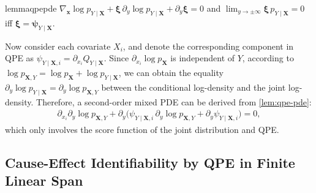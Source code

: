 \documentclass{article}
\theoremstyle{plain}
\theoremstyle{definition}
\theoremstyle{remark}
\begin{document}
\begin{restatable}{lemma}{qpepde}
\label{lem:qpe-pde}
$\nabla_{\bm{x}}\log p_{Y\mid\bm{X}}+\bm{\xi}\,\partial_y\log p_{Y\mid\bm{X}}+\partial_y\bm{\xi}=0$ and $\lim_{y\to\pm\infty}\bm{\xi}\,p_{Y\mid\bm{X}}=0$ iff $\bm{\xi}=\bm{\psi}_{Y\mid\bm{X}}$.
\end{restatable}

Now consider each covariate $X_i$, and denote the corresponding component in QPE as $\psi_{Y\mid\bm{X},i}=\partial_{x_i}Q_{Y\mid\bm{X}}$. Since $\partial_{x_i}\log p_{\bm{X}}$ is independent of $Y$, according to $\log p_{\bm{X},Y}=\log p_{\bm{X}}+\log p_{Y\mid\bm{X}}$, we can obtain the equality $\partial_y\log p_{Y\mid\bm{X}}=\partial_y\log p_{\bm{X},Y}$ between the conditional log-density and the joint log-density. Therefore, a second-order mixed PDE can be derived from \cref{lem:qpe-pde}:
\begin{align}
\label{eq:mixed-pde}
\partial_{x_i}\partial_y\log p_{\bm{X},Y}+\partial_y\big(\psi_{Y\mid\bm{X},i}\,\partial_y\log p_{\bm{X},Y}+\partial_y\psi_{Y\mid\bm{X},i}\big)=0,\end{align}
which only involves the score function of the joint distribution and QPE.


\subsection{{Cause-Effect Identifiability by QPE in Finite Linear Span}}
\label{ssec:identify}
\end{document}

